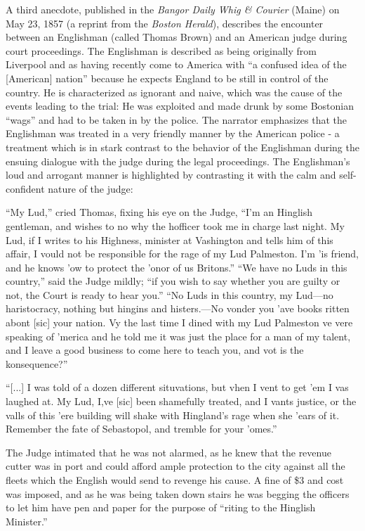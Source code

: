 A third anecdote, published in the \emph{Bangor Daily Whig \& Courier} (Maine) on May 23, 1857 (a reprint from the \emph{Boston Herald}), describes the encounter between an Englishman (called Thomas Brown) and an American judge during court proceedings. The Englishman is described as being originally from Liverpool and as having recently come to America with “a confused idea of the [American] nation” because he expects England to be still in control of the country. He is characterized as ignorant and naive, which was the cause of the events leading to the trial: He was exploited and made drunk by some Bostonian “wags” and had to be taken in by the police. The narrator emphasizes that the Englishman was treated in a very friendly manner by the American police - a treatment which is in stark contrast to the behavior of the Englishman during the ensuing dialogue with the judge during the legal proceedings. The Englishman's loud and arrogant manner is highlighted by contrasting it with the calm and self-confident nature of the judge:

\begin{ipquote}
{“My Lud,” cried Thomas, fixing his eye on the Judge, “I'm an Hinglish gentleman, and wishes to no why the hofficer took me in charge last night. My Lud, if I writes to his Highness, minister at Vashington and tells him of this affair, I vould not be responsible for the rage of my Lud Palmeston. I'm 'is friend, and he knows 'ow to protect the 'onor of us Britons.”
“We have no Luds in this country,” said the Judge mildly; “if you wish to say whether you are guilty or not, the Court is ready to hear you.”
“No Luds in this country, my Lud—no haristocracy, nothing but hingins and histers.—No vonder you 'ave books ritten abont [sic] your nation. Vy the last time I dined with my Lud Palmeston ve vere speaking of 'merica and he told me it was just the place for a man of my talent, and I leave a good business to come here to teach you, and vot is the konsequence?”

\centering[...]

“[...] I was told of a dozen different situvations, but vhen I vent to get 'em I vas laughed at. My Lud, I,ve [sic] been shamefully treated, and I vants justice, or the valls of this 'ere building will shake with Hingland's rage when she 'ears of it. Remember the fate of Sebastopol, and tremble for your 'omes.”}
The Judge intimated that he was not alarmed, as he knew that the revenue cutter was in port and could afford ample protection to the city against all the fleets which the English would send to revenge his cause. A fine of \$3 and cost was imposed, and as he was being taken down stairs he was begging the officers to let him have pen and paper for the purpose of “riting to the Hinglish Minister.”
\end{ipquote}


